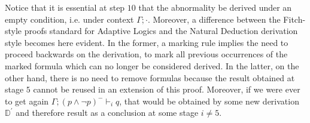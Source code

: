 \documentclass[]{article}
\newcommand{\TurnOne}[2]
	{ {#1}\vdash_{\textbf{\sf 1}}  {#2}}
\newcommand{\TurnTwo}[2]
	{ {#1}\vdash_{\textbf{\sf 2}}  {#2}}
\newcommand{\TurnThree}[2]
	{ {#1}\vdash_{\textbf{\sf 3}}  {#2}}
\newcommand{\TurnFour}[2]
	{ {#1}\vdash_{\textbf{\sf 4}}  {#2}}
\newcommand{\TurnFive}[2]
	{ {#1}\vdash_{\textbf{\sf 5}}  {#2}}
\newcommand{\TurnSix}[2]
	{ {#1}\vdash_{\textbf{\sf 6}}  {#2}}
\newcommand{\TurnMarkedSevenREL}[2]
	{ {#1}\vdash_{\textbf{\sf 7\XBox R}}  {#2}}
\newcommand{\TurnMarkedEightREL}[2]
	{ {#1}\vdash_{\textbf{\sf 8\XBox R}}  {#2}}
\begin{document}
Notice that it is essential at step $10$ that the abnormality be derived under an empty condition, i.e. under context $\Gamma;\cdot$. Moreover, a difference between the Fitch-style proofs standard for Adaptive Logics and the Natural Deduction derivation style becomes here evident. In the former, a marking rule implies the need to proceed backwards on the derivation, to mark all previous occurrences of the marked formula which can no longer be considered derived. In the latter, on the other hand, there is no need to remove formulas because the result obtained at stage $5$ cannot be reused in an extension of this proof. Moreover, if we were ever to get again $\Gamma; (p \wedge \neg p)^{-} \vdash_{i} q$, that would be obtained by some new derivation $\mathbb{D}^{\prime}$ and therefore result as a conclusion at some stage $i\neq 5$.


%
%
%
%
\end{document}
